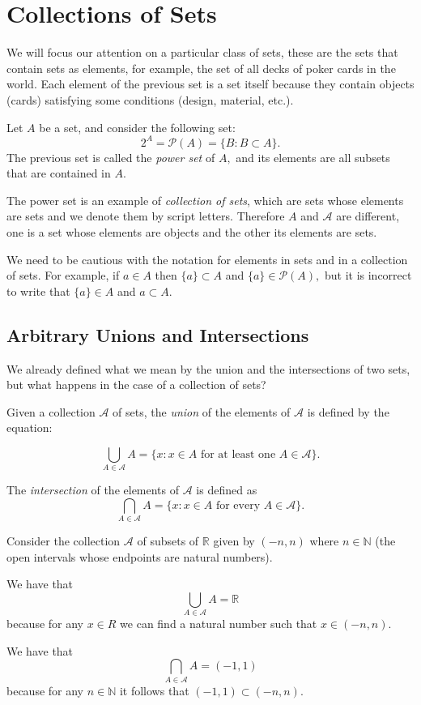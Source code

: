 \documentclass[
	fontsize=10pt, %
	twoside=false, %
	secnumdepth=1, %
]{kaobook}
\begin{document}
\section{Collections of Sets}

We will focus our attention on a particular class of sets, these are the sets that contain sets as elements, for example, the set of all decks of poker cards in the world. Each element of the previous set is a set itself because they contain objects (cards) satisfying some conditions (design, material, etc.).

\begin{definition}
Let $A$ be a set, and consider the following set: $$2^A=\mathcal{P}(A)=\{B: B\subset A\}.$$ The previous set is called the \emph{power set} of $A,$ and its elements are all subsets that are contained in $A.$
\end{definition}

The power set is an example of \emph{collection of sets}, which are sets whose elements are sets and we denote them by script letters. Therefore $A$ and $\mathcal{A}$ are different, one is a set whose elements are objects and the other its elements are sets.

We need to be cautious with the notation for elements in sets and in a collection of sets. For example, if $a\in A$ then $\{a\}\subset A$ and $\{a\}\in \mathcal{P}(A),$ but it is incorrect to write that $\{a\}\in A$  and $a\subset A.$


\subsection{Arbitrary Unions and Intersections}

We already defined what we mean by the union and the intersections of two sets, but what happens in the case of a collection of sets? 

Given a collection $\mathcal{A}$ of sets, the \emph{union} of the elements of $\mathcal{A}$ is defined by the equation:

$$\bigcup_{A\in \mathcal{A}} A= \{x : x\in A\mbox{ for at least one }A\in \mathcal{A}\}.$$

The \emph{intersection} of the elements of $\mathcal{A}$ is defined as 
$$\bigcap_{A\in \mathcal{A}} A= \{x : x\in A\mbox{ for every }A\in \mathcal{A}\}.$$

\begin{example}
Consider the collection $\mathcal{A}$ of subsets of $\mathbb{R}$ given by $(-n,n)$ where $n\in\mathbb{N}$ (the open intervals whose endpoints are natural numbers). 

We have that $$\bigcup_{A\in\mathcal{A}}A =\mathbb{R}$$ because for any $x\in R$ we can find a natural number such that $x\in (-n,n).$

We have that $$\bigcap_{A\in\mathcal{A}} A= (-1,1)$$ because for any $n\in\mathbb{N}$ it follows that $(-1,1)\subset (-n,n).$
\end{example}
\end{document}
